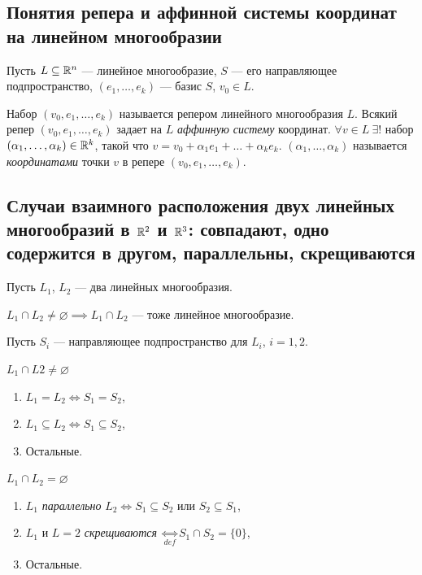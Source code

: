 \subsection{Понятия репера и аффинной системы координат на линейном многообразии}

Пусть $L \subseteq \mathbb{R}^n$ --- линейное многообразие, $S$ --- его направляющее подпространство, $(e_1, \dots, e_k)$ --- базис $S$, $v_0 \in L$.

\begin{definition}
    Набор $(v_0, e_1, \dots, e_k)$ называется репером линейного многообразия $L$.
    Всякий репер $(v_0, e_1, \dots, e_k)$ задает на $L$ \textit{аффинную систему} координат.
    $\forall v \in L \ \exists!$ набор $(\alpha_1, \dots, \alpha_k) \in \mathbb{R}^k$, такой что $v = v_0 + \alpha_1 e_1 + \dots + \alpha_k e_k$. $(\alpha_1, \dots, \alpha_k)$ называется \textit{координатами} точки $v$ в репере $(v_0, e_1, \dots, e_k)$.
\end{definition}


\subsection{Случаи взаимного расположения двух линейных многообразий в $\mathbb{R}^2$ и $\mathbb{R}^3$: совпадают, одно содержится в другом, параллельны, скрещиваются}

Пусть $L_1$, $L_2$ --- два линейных многообразия.

$L_1 \cap L_2 \neq \varnothing \implies L_1 \cap L_2$ --- тоже линейное многообразие.

Пусть $S_i$ --- направляющее подпространство для $L_i$, $i = 1, 2$.

\bigskip
\begin{minipage}{0.3\linewidth}
    \hspace{1cm} $L_1 \cap L2 \neq \varnothing$
    \begin{enumerate}[nosep]
    \item $L_1 = L_2 \iff S_1 = S_2$,
    \item $L_1 \subseteq L_2 \iff S_1 \subseteq S_2$,
    \item Остальные.
    \end{enumerate}
\end{minipage}
\begin{minipage}{0.5\linewidth}
    \hspace{1cm} $L_1 \cap L_2 = \varnothing$
    \begin{enumerate}[nosep]
    \item $L_1$ \textit{параллельно} $L_2 \iff S_1 \subseteq S_2$ или $S_2 \subseteq S_1$,
    \item $L_1$ и $L=2$ \textit{скрещиваются} $\underset{def}{\iff} S_1 \cap S_2 = \{0\}$,
    \item Остальные.
    \end{enumerate}
\end{minipage}


